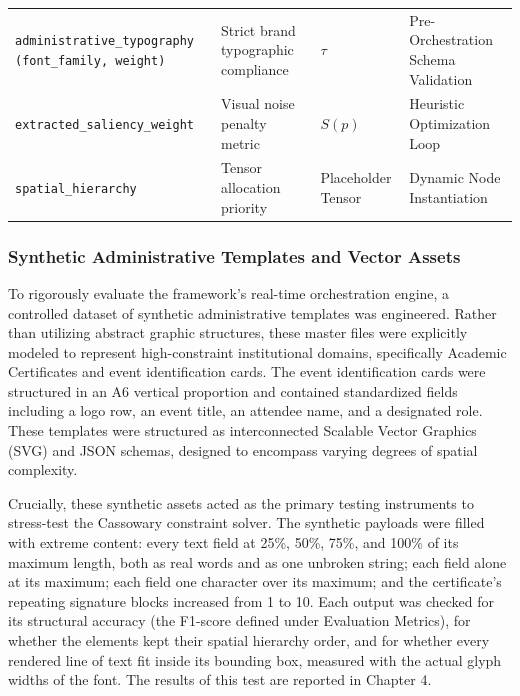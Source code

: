 \begin{refsection}
\begin{table}[ht]
\begin{tabular}{p{} p{} p{} p{}}
\texttt{administrative\_\allowbreak typography (font\_\allowbreak family, weight)} 
& Strict brand typographic compliance 
& $\tau$ 
& Pre-Orchestration Schema Validation \\

\texttt{extracted\_\allowbreak saliency\_\allowbreak weight} 
& Visual noise penalty metric 
& $S(p)$ 
& Heuristic Optimization Loop \\

\texttt{spatial\_\allowbreak hierarchy} 
& Tensor allocation priority 
& Placeholder Tensor 
& Dynamic Node Instantiation \\ \hline

\end{tabular}
\end{table}


\subsubsection{Synthetic Administrative Templates and Vector Assets}
To rigorously evaluate the framework's real-time orchestration engine, a controlled dataset of synthetic administrative templates was engineered. Rather than utilizing abstract graphic structures, these master files were explicitly modeled to represent high-constraint institutional domains, specifically Academic Certificates and event identification cards. The event identification cards were structured in an A6 vertical proportion and contained standardized fields including a logo row, an event title, an attendee name, and a designated role. These templates were structured as interconnected Scalable Vector Graphics (SVG) and JSON schemas, designed to encompass varying degrees of spatial complexity.

Crucially, these synthetic assets acted as the primary testing instruments to stress-test the Cassowary constraint solver. The synthetic payloads were filled with extreme content: every text field at 25\%, 50\%, 75\%, and 100\% of its maximum length, both as real words and as one unbroken string; each field alone at its maximum; each field one character over its maximum; and the certificate's repeating signature blocks increased from 1 to 10. Each output was checked for its structural accuracy (the F1-score defined under Evaluation Metrics), for whether the elements kept their spatial hierarchy order, and for whether every rendered line of text fit inside its bounding box, measured with the actual glyph widths of the font. The results of this test are reported in Chapter 4.




\end{refsection}
